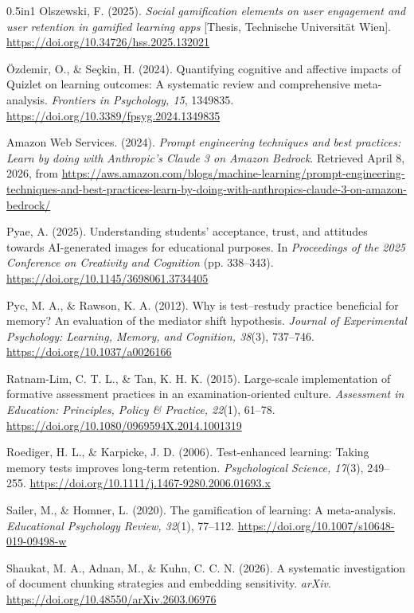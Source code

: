\documentclass[
  12pt,
  a4paper,
]{report}
\begin{document}
\begin{hangparas}{0.5in}{1}
Olszewski, F. (2025). \textit{Social gamification elements on user engagement and user retention in gamified learning apps} [Thesis, Technische Universität Wien]. \url{https://doi.org/10.34726/hss.2025.132021}

Özdemir, O., \& Seçkin, H. (2024). Quantifying cognitive and affective impacts of Quizlet on learning outcomes: A systematic review and comprehensive meta-analysis. \textit{Frontiers in Psychology, 15}, 1349835. \url{https://doi.org/10.3389/fpsyg.2024.1349835}

Amazon Web Services. (2024). \textit{Prompt engineering techniques and best practices: Learn by doing with Anthropic's Claude 3 on Amazon Bedrock}. Retrieved April 8, 2026, from \url{https://aws.amazon.com/blogs/machine-learning/prompt-engineering-techniques-and-best-practices-learn-by-doing-with-anthropics-claude-3-on-amazon-bedrock/}

Pyae, A. (2025). Understanding students' acceptance, trust, and attitudes towards AI-generated images for educational purposes. In \textit{Proceedings of the 2025 Conference on Creativity and Cognition} (pp. 338--343). \url{https://doi.org/10.1145/3698061.3734405}

Pyc, M. A., \& Rawson, K. A. (2012). Why is test--restudy practice beneficial for memory? An evaluation of the mediator shift hypothesis. \textit{Journal of Experimental Psychology: Learning, Memory, and Cognition, 38}(3), 737--746. \url{https://doi.org/10.1037/a0026166}

Ratnam-Lim, C. T. L., \& Tan, K. H. K. (2015). Large-scale implementation of formative assessment practices in an examination-oriented culture. \textit{Assessment in Education: Principles, Policy \& Practice, 22}(1), 61--78. \url{https://doi.org/10.1080/0969594X.2014.1001319}

Roediger, H. L., \& Karpicke, J. D. (2006). Test-enhanced learning: Taking memory tests improves long-term retention. \textit{Psychological Science, 17}(3), 249--255. \url{https://doi.org/10.1111/j.1467-9280.2006.01693.x}

Sailer, M., \& Homner, L. (2020). The gamification of learning: A meta-analysis. \textit{Educational Psychology Review, 32}(1), 77--112. \url{https://doi.org/10.1007/s10648-019-09498-w}

Shaukat, M. A., Adnan, M., \& Kuhn, C. C. N. (2026). A systematic investigation of document chunking strategies and embedding sensitivity. \textit{arXiv}. \url{https://doi.org/10.48550/arXiv.2603.06976}


\end{hangparas}
\end{document}
